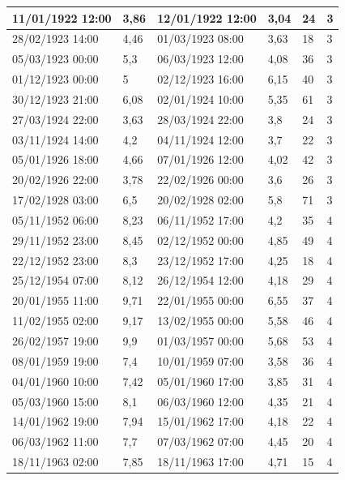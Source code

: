 \documentclass[11pt]{article}
\begin{document}
\begin{longtable}{|l|p{2.3cm}|l|p{2.3cm}|l|l|}
        11/01/1922 12:00 & 3,86 & 12/01/1922 12:00 & 3,04 & 24 & 3 \\ \hline
        28/02/1923 14:00 & 4,46 & 01/03/1923 08:00 & 3,63 & 18 & 3 \\ \hline
        05/03/1923 00:00 & 5,3 & 06/03/1923 12:00 & 4,08 & 36 & 3 \\ \hline
        01/12/1923 00:00 & 5 & 02/12/1923 16:00 & 6,15 & 40 & 3 \\ \hline
        30/12/1923 21:00 & 6,08 & 02/01/1924 10:00 & 5,35 & 61 & 3 \\ \hline
        27/03/1924 22:00 & 3,63 & 28/03/1924 22:00 & 3,8 & 24 & 3 \\ \hline
        03/11/1924 14:00 & 4,2 & 04/11/1924 12:00 & 3,7 & 22 & 3 \\ \hline
        05/01/1926 18:00 & 4,66 & 07/01/1926 12:00 & 4,02 & 42 & 3 \\ \hline
        20/02/1926 22:00 & 3,78 & 22/02/1926 00:00 & 3,6 & 26 & 3 \\ \hline
        17/02/1928 03:00 & 6,5 & 20/02/1928 02:00 & 5,8 & 71 & 3 \\ \hline
        05/11/1952 06:00 & 8,23 & 06/11/1952 17:00 & 4,2 & 35 & 4 \\ \hline
        29/11/1952 23:00 & 8,45 & 02/12/1952 00:00 & 4,85 & 49 & 4 \\ \hline
        22/12/1952 23:00 & 8,3 & 23/12/1952 17:00 & 4,25 & 18 & 4 \\ \hline
        25/12/1954 07:00 & 8,12 & 26/12/1954 12:00 & 4,18 & 29 & 4 \\ \hline
        20/01/1955 11:00 & 9,71 & 22/01/1955 00:00 & 6,55 & 37 & 4 \\ \hline
        11/02/1955 02:00 & 9,17 & 13/02/1955 00:00 & 5,58 & 46 & 4 \\ \hline
        26/02/1957 19:00 & 9,9 & 01/03/1957 00:00 & 5,68 & 53 & 4 \\ \hline
        08/01/1959 19:00 & 7,4 & 10/01/1959 07:00 & 3,58 & 36 & 4 \\ \hline
        04/01/1960 10:00 & 7,42 & 05/01/1960 17:00 & 3,85 & 31 & 4 \\ \hline
        05/03/1960 15:00 & 8,1 & 06/03/1960 12:00 & 4,35 & 21 & 4 \\ \hline
        14/01/1962 19:00 & 7,94 & 15/01/1962 17:00 & 4,18 & 22 & 4 \\ \hline
        06/03/1962 11:00 & 7,7 & 07/03/1962 07:00 & 4,45 & 20 & 4 \\ \hline
        18/11/1963 02:00 & 7,85 & 18/11/1963 17:00 & 4,71 & 15 & 4 \\ \hline

\end{longtable}
\end{document}
